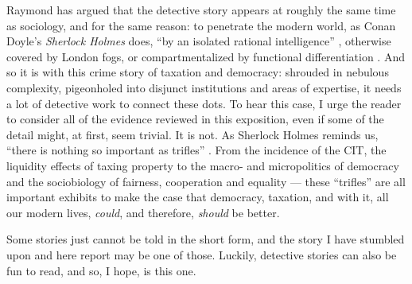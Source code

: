 Raymond \citeauthor{Williams1992} has argued that the detective story appears at roughly the same time as sociology, and for the same reason:
to penetrate the modern world, as Conan Doyle's \emph{Sherlock Holmes} does, ``by an isolated rational intelligence'' \citep[88]{Williams1992}, otherwise covered by London fogs, or compartmentalized by functional differentiation \citep{Durkheim-1893-aa}.
And so it is with this crime story of taxation and democracy:
shrouded in nebulous complexity, pigeonholed into disjunct institutions and areas of expertise, it needs a lot of detective work to connect these dots.
To hear this case, I urge the reader to consider all of the evidence reviewed in this exposition, even if some of the detail might, at first, seem trivial.
It is not.
As Sherlock Holmes reminds us, ``there is nothing so important as trifles'' \citep[238]{Doyle1891}.
From the incidence of the \gls{CIT}, the liquidity effects of taxing property to the macro- and micropolitics of democracy and the sociobiology of fairness, cooperation and equality
--- these ``trifles'' are all important exhibits to make the case that democracy, taxation, and with it, all our modern lives, \emph{could}, and therefore, \emph{should} be better.

Some stories just cannot be told in the short form, and the story I have stumbled upon and here report may be one of those.
Luckily, detective stories can also be fun to read, and so, I hope, is this one.